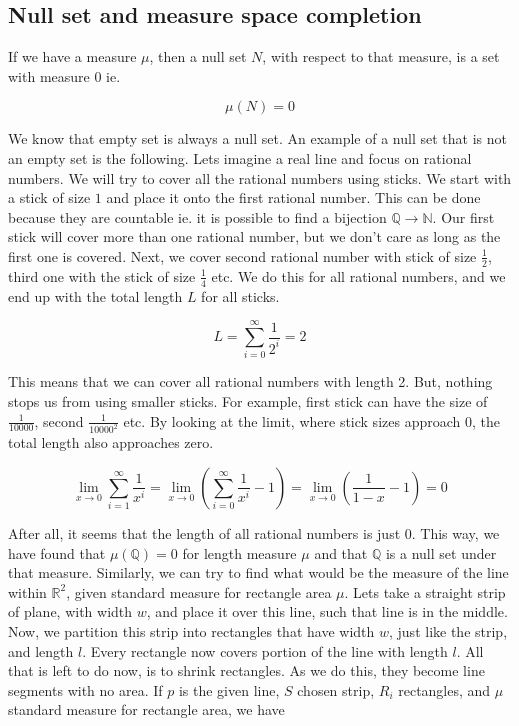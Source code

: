 \documentclass{article}
\begin{document}
\subsection{Null set and measure space completion}
If we have a measure $\mu$, then a null set $N$, with respect to that measure, is a set with measure 0 ie.

\[ \mu(N) = 0 \]

We know that empty set is always a null set. An example of a null set that is not an empty set is the following. Lets imagine a real line and focus on rational numbers. We will try to cover all the rational numbers using sticks. We start with a stick of size $1$ and place it onto the first rational number. This can be done because they are countable ie. it is possible to find a bijection $\mathbb{Q}\to\mathbb{N}$. Our first stick will cover more than one rational number, but we don't care as long as the first one is covered. Next, we cover second rational number with stick of size $\frac{1}{2}$, third one with the stick of size $\frac{1}{4}$ etc. We do this for all rational numbers, and we end up with the total length $L$ for all sticks.

\[ L=\sum_{i=0}^{\infty}\frac{1}{2^i}=2\]

This means that we can cover all rational numbers with length 2. But, nothing stops us from using smaller sticks. For example, first stick can have the size of $\frac{1}{10000}$, second $\frac{1}{10000^2}$ etc. By looking at the limit, where stick sizes approach 0, the total length also approaches zero.

\[ \lim_{x \to 0}\sum_{i=1}^{\infty}\frac{1}{x^i}=\lim_{x \to 0}(\sum_{i=0}^{\infty}\frac{1}{x^i}-1)=\lim_{x \to 0} (\frac{1}{1-x} - 1)=0 \]

After all, it seems that the length of all rational numbers is just 0. This way, we have found that $\mu(\mathbb{Q})=0$ for length measure $\mu$ and that $\mathbb{Q}$ is a null set under that measure.
\newline\indent Similarly, we can try to find what would be the measure of the line within $\mathbb{R}^2$, given standard measure for rectangle area $\mu$. Lets take a straight strip of plane, with width $w$, and place it over this line, such that line is in the middle. Now, we partition this strip into rectangles that have width $w$, just like the strip, and length $l$. Every rectangle now covers portion of the line with length $l$. All that is left to do now, is to shrink rectangles. As we do this, they become line segments with no area. If $p$ is the given line, $S$ chosen strip, $R_i$ rectangles, and $\mu$ standard measure for rectangle area, we have
\end{document}

